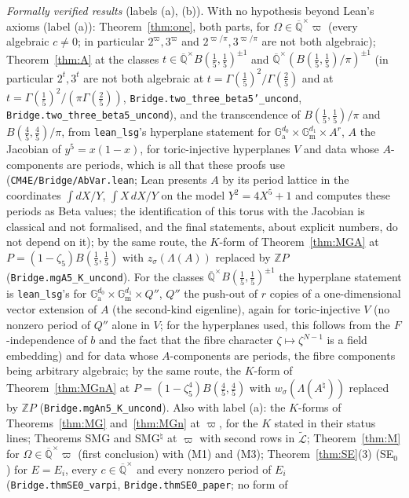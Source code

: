 \documentclass[11pt]{amsart}
\theoremstyle{definition}
\newcommand{\Qb}{\overline{\mathbb{Q}}}
\newcommand{\Z}{\mathbb{Z}}
\newcommand{\Ga}{\mathbb{G}_{\mathrm a}}
\newcommand{\Gm}{\mathbb{G}_{\mathrm m}}
\newcommand{\Lt}{\widetilde{\mathcal{L}}}
\newcommand{\vp}{\varpi}
\begin{document}
\emph{Formally verified results} (labels (a), (b)). With no hypothesis beyond Lean's axioms (label (a)):
Theorem~\ref{thm:one}, both parts, for $\Omega\in\Qb^\times\vp$ (every algebraic $c\neq0$; in particular $2^{\vp},3^{\vp}$ and
$2^{\vp/\pi},3^{\vp/\pi}$ are not both algebraic); Theorem~\ref{thm:A} at the classes
$t\in\Qb^\times B(\frac15,\frac15)^{\pm1}$ and $\Qb^\times(B(\frac15,\frac15)/\pi)^{\pm1}$ (in particular $2^t,3^t$ are not
both algebraic at $t=\Gamma(\frac15)^2/\Gamma(\frac25)$ and at $t=\Gamma(\frac15)^2/(\pi\Gamma(\frac25))$,
\texttt{Bridge.two\_three\_beta5'\_uncond}, \texttt{Bridge.two\_three\_beta5\_uncond}), and the transcendence
of $B(\frac15,\frac15)/\pi$ and $B(\frac45,\frac45)/\pi$, from \texttt{lean\_lsg}'s hyperplane statement for $\Ga^{d_0}\times\Gm^{d_1}\times A^r$, $A$
the Jacobian of $y^5=x(1-x)$, for toric-injective hyperplanes $V$ and data whose $A$-components are periods, which is all
that these proofs use (\texttt{CM4E/Bridge/AbVar.lean}; Lean presents $A$ by its period lattice in the coordinates
$\int dX/Y$, $\int X\,dX/Y$ on the model $Y^2=4X^5+1$ and computes these periods as Beta values; the identification of this
torus with the Jacobian is classical and not formalised, and the final statements, about explicit numbers, do not depend
on it); by the same route,
the $K$-form of Theorem~\ref{thm:MGA} at $P=(1-\zeta_5)B(\frac15,\frac15)$ with $z_\sigma(\Lambda(A))$ replaced by $\Z P$
(\texttt{Bridge.mgA5\_K\_uncond}). For the classes $\Qb^\times B(\frac15,\frac15)^{\pm1}$ the hyperplane statement is
\texttt{lean\_lsg}'s for $\Ga^{d_0}\times\Gm^{d_1}\times Q''$, $Q''$ the push-out of $r$ copies of a one-dimensional vector
extension of $A$ (the second-kind eigenline), again for toric-injective $V$ (no nonzero period of $Q''$ alone in $V$; for
the hyperplanes used, this follows from the $F$-independence of $b$ and the fact that the fibre character
$\zeta\mapsto\zeta^{N-1}$ is a field embedding) and for data whose $A$-components are periods, the fibre components being
arbitrary algebraic; by the same route, the $K$-form of Theorem~\ref{thm:MGnA} at $P=(1-\zeta_5^4)B(\frac45,\frac45)$ with
$w_\sigma(\Lambda(A^\natural))$ replaced by $\Z P$ (\texttt{Bridge.mgAn5\_K\_uncond}). Also with label (a): the $K$-forms of Theorems~\ref{thm:MG} and~\ref{thm:MGn} at $\vp$, for the
$K$ stated in their status lines; Theorems SMG and SMG$^\natural$ at $\vp$ with second rows in $\Lt$; Theorem~\ref{thm:M}
for $\Omega\in\Qb^\times\vp$ (first conclusion) with (M1) and (M3); Theorem~\ref{thm:SE}(3) (SE$_0$) for $E=E_i$, every
$c\in\Qb^\times$ and every nonzero period of $E_i$ (\texttt{Bridge.thmSE0\_varpi}, \texttt{Bridge.thmSE0\_paper}; no form of
\end{document}
